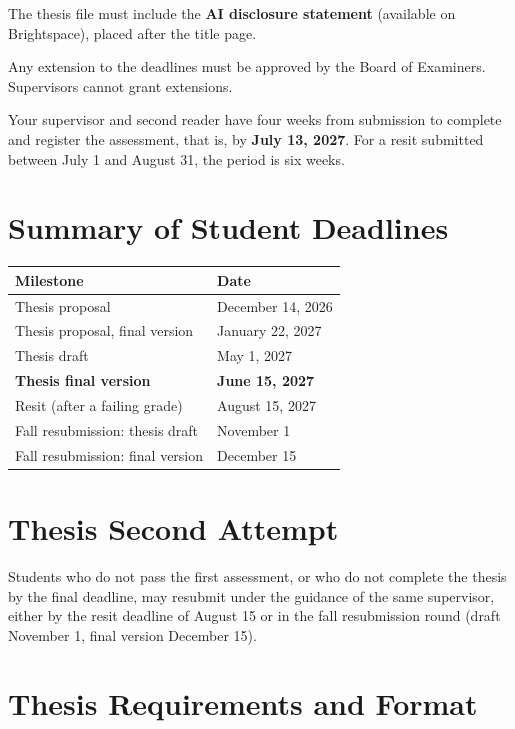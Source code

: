 \documentclass[11pt,a4paper]{article}
\begin{document}
The thesis file must include the \textbf{AI disclosure statement} (available on Brightspace), placed after the title page.

Any extension to the deadlines must be approved by the Board of Examiners. Supervisors cannot grant extensions.

Your supervisor and second reader have four weeks from submission to complete and register the assessment, that is, by \textbf{July 13, 2027}. For a resit submitted between July 1 and August 31, the period is six weeks.

\section{Summary of Student Deadlines}

\begin{center}
\begin{tabularx}{\textwidth}{Xl}
\toprule
\textbf{Milestone} & \textbf{Date} \\
\midrule
Thesis proposal & December 14, 2026 \\
Thesis proposal, final version & January 22, 2027 \\
Thesis draft & May 1, 2027 \\
\textbf{Thesis final version} & \textbf{June 15, 2027} \\
\midrule
Resit (after a failing grade) & August 15, 2027 \\
Fall resubmission: thesis draft & November 1 \\
Fall resubmission: final version & December 15 \\
\bottomrule
\end{tabularx}
\end{center}

\section{Thesis Second Attempt}

Students who do not pass the first assessment, or who do not complete the thesis by the final deadline, may resubmit under the guidance of the same supervisor, either by the resit deadline of August 15 or in the fall resubmission round (draft November 1, final version December 15).

\section{Thesis Requirements and Format}
\end{document}
